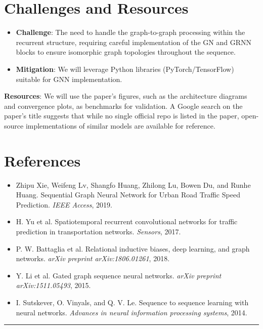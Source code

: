 \documentclass[11pt, a4paper]{article}
\begin{document}
\section*{Challenges and Resources}
\begin{itemize}
    \item \textbf{Challenge}: The need to handle the graph-to-graph processing within the recurrent structure, requiring careful implementation of the GN and GRNN blocks to ensure isomorphic graph topologies throughout the sequence.
    \item \textbf{Mitigation}: We will leverage Python libraries (PyTorch/TensorFlow) suitable for GNN implementation.
\end{itemize}
\vspace{0.2cm}
\newpage

\noindent\textbf{Resources}: We will use the paper's figures, such as the architecture diagrams and convergence plots, as benchmarks for validation. A Google search on the paper's title suggests that while no single official repo is listed in the paper, open-source implementations of similar models are available for reference.

\section*{References}
\begin{itemize}[label={[\arabic*]}]
    \item Zhipu Xie, Weifeng Lv, Shangfo Huang, Zhilong Lu, Bowen Du, and Runhe Huang. Sequential Graph Neural Network for Urban Road Traffic Speed Prediction. \textit{IEEE Access}, 2019.
    \item H. Yu et al. Spatiotemporal recurrent convolutional networks for traffic prediction in transportation networks. \textit{Sensors}, 2017.
    \item P. W. Battaglia et al. Relational inductive biases, deep learning, and graph networks. \textit{arXiv preprint arXiv:1806.01261}, 2018.
    \item Y. Li et al. Gated graph sequence neural networks. \textit{arXiv preprint arXiv:1511.05493}, 2015.
    \item I. Sutskever, O. Vinyals, and Q. V. Le. Sequence to sequence learning with neural networks. \textit{Advances in neural information processing systems}, 2014.
\end{itemize}

\hrule
\vspace{0.2cm}
\end{document}
